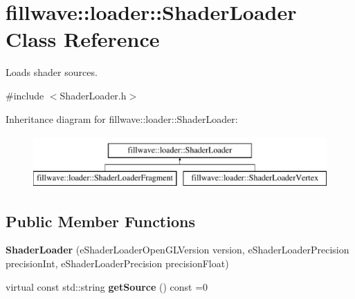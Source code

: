 \hypertarget{classfillwave_1_1loader_1_1ShaderLoader}{}\section{fillwave\+:\+:loader\+:\+:Shader\+Loader Class Reference}
\label{classfillwave_1_1loader_1_1ShaderLoader}


Loads shader sources.  




{\ttfamily \#include $<$Shader\+Loader.\+h$>$}

Inheritance diagram for fillwave\+:\+:loader\+:\+:Shader\+Loader\+:\begin{figure}[H]
\begin{center}
\leavevmode
\includegraphics[height=2.000000cm]{classfillwave_1_1loader_1_1ShaderLoader}
\end{center}
\end{figure}
\subsection*{Public Member Functions}
\begin{DoxyCompactItemize}
\item 
\hypertarget{classfillwave_1_1loader_1_1ShaderLoader_a9e56f85a1a5d5f9ce5555649f25aa7f9}{}{\bfseries Shader\+Loader} (e\+Shader\+Loader\+Open\+G\+L\+Version version, e\+Shader\+Loader\+Precision precision\+Int, e\+Shader\+Loader\+Precision precision\+Float)\label{classfillwave_1_1loader_1_1ShaderLoader_a9e56f85a1a5d5f9ce5555649f25aa7f9}

\item 
\hypertarget{classfillwave_1_1loader_1_1ShaderLoader_ae1ce812a76619b93369d038839cb9825}{}virtual const std\+::string {\bfseries get\+Source} () const =0\label{classfillwave_1_1loader_1_1ShaderLoader_ae1ce812a76619b93369d038839cb9825}

\end{DoxyCompactItemize}
